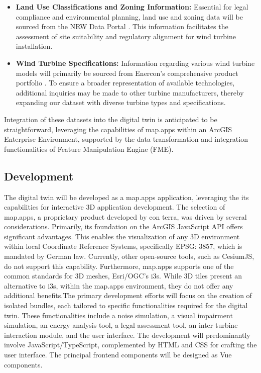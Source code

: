 \documentclass[11pt, titlepage, a4paper]{scrartcl}
\begin{document}
\begin{linenumbers}
\begin{itemize}
        \item \textbf{Land Use Classifications and Zoning Information:} Essential for legal compliance and environmental planning, land use and zoning data will be sourced from the NRW Data Portal \cite{ministeriumfurheimatkommunalesbauunddigitalisierungdeslandesnordrhein-westfalenOpenNRW}. This information facilitates the assessment of site suitability and regulatory alignment for wind turbine installation.

        \item \textbf{Wind Turbine Specifications:} Information regarding various wind turbine models will primarily be sourced from Enercon’s comprehensive product portfolio \cite{enerconglobalgmbhENERCONWindenergieanlagenPortfolio}. To ensure a broader representation of available technologies, additional inquiries may be made to other turbine manufacturers, thereby expanding our dataset with diverse turbine types and specifications.
    \end{itemize}

    Integration of these datasets into the digital twin is anticipated to be straightforward, leveraging the capabilities of map.apps within an ArcGIS Enterprise Environment, supported by the data transformation and integration functionalities of Feature Manipulation Engine (FME).




    \subsection{Development}
    The digital twin will be developed as a map.apps application, leveraging the its capabilities for interactive 3D application development. The selection of map.apps, a proprietary product developed by con terra, was driven by several considerations. Primarily, its foundation on the ArcGIS JavaScript API offers significant advantages. This  enables the visualization of any 3D environment within local Coordinate Reference Systems, specifically EPSG: 3857, which is mandated by German law. Currently, other open-source tools, such as CesiumJS, do not support this capability. Furthermore, map.apps supports one of the common standards for 3D meshes, Esri/OGC's i3s. While 3D tiles present an alternative to i3s, within the map.apps environment, they do not offer any additional benefits.The primary development efforts will focus on the creation of isolated bundles, each tailored to specific functionalities required for the digital twin. These functionalities include a noise simulation, a visual impairment simulation, an energy analysis tool, a legal assessment tool, an inter-turbine interaction module, and the user interface. The development will predominantly involve JavaScript/TypeScript, complemented by HTML and CSS for crafting the user interface. The principal frontend components will be designed as Vue components.


\end{linenumbers}
\end{document}
